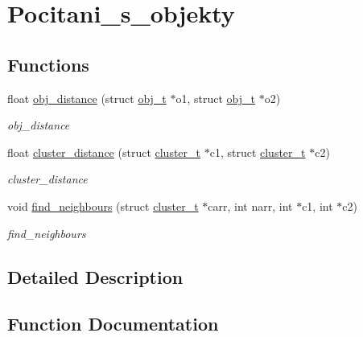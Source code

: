 \hypertarget{group__Pocitani__s__objekty}{}\section{Pocitani\+\_\+s\+\_\+objekty}
\label{group__Pocitani__s__objekty}
\subsection*{Functions}
\begin{DoxyCompactItemize}
\item 
float \hyperlink{group__Pocitani__s__objekty_ga703ce6afddf65026b68645bc5394405b}{obj\+\_\+distance} (struct \hyperlink{structobj__t}{obj\+\_\+t} $\ast$o1, struct \hyperlink{structobj__t}{obj\+\_\+t} $\ast$o2)
\begin{DoxyCompactList}\small\item\em obj\+\_\+distance \end{DoxyCompactList}\item 
float \hyperlink{group__Pocitani__s__objekty_gaf336f28a62c28da792f6def84f432bb2}{cluster\+\_\+distance} (struct \hyperlink{structcluster__t}{cluster\+\_\+t} $\ast$c1, struct \hyperlink{structcluster__t}{cluster\+\_\+t} $\ast$c2)
\begin{DoxyCompactList}\small\item\em cluster\+\_\+distance \end{DoxyCompactList}\item 
void \hyperlink{group__Pocitani__s__objekty_ga5f16d682e7c859f7bd3f27697c2b7cc0}{find\+\_\+neighbours} (struct \hyperlink{structcluster__t}{cluster\+\_\+t} $\ast$carr, int narr, int $\ast$c1, int $\ast$c2)
\begin{DoxyCompactList}\small\item\em find\+\_\+neighbours \end{DoxyCompactList}\end{DoxyCompactItemize}


\subsection{Detailed Description}


\subsection{Function Documentation}
\hypertarget{group__Pocitani__s__objekty_gaf336f28a62c28da792f6def84f432bb2}{}\label{group__Pocitani__s__objekty_gaf336f28a62c28da792f6def84f432bb2} 
